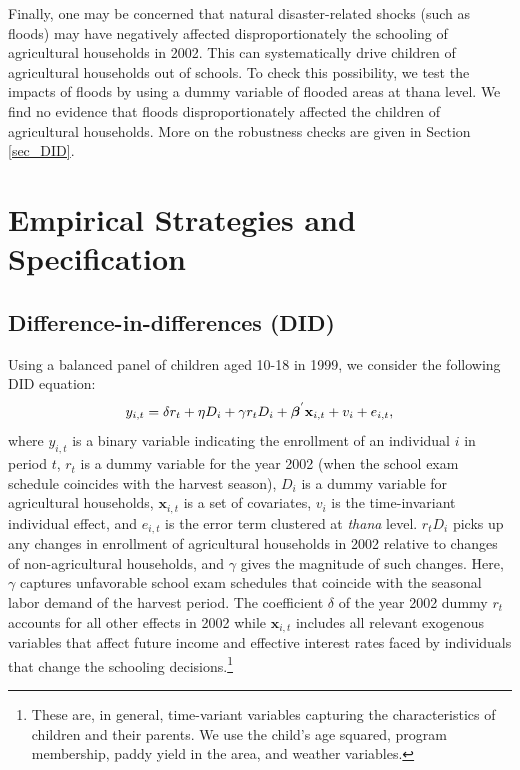 \documentclass[12pt,letterpaper]{article}
\newcommand{\SAdded}[1]{\textcolor{red}{#1}}
\newcommand{\bfbeta}{\ensuremath{\mbox{\boldmath $\beta$}}}
\newcommand{\0}{\ensuremath{\mbox{\boldmath $0$}}}
\begin{document}
Finally, one may be concerned that natural disaster-related shocks (such as floods) may have negatively affected disproportionately the schooling of agricultural households in 2002. This can systematically drive children of agricultural households out of schools. To check this possibility, we test the impacts of floods by using a dummy variable of flooded areas at thana level. We find no evidence that floods disproportionately affected the children of agricultural households. More on the robustness checks are given in Section \ref{sec_DID}. 


\section{Empirical Strategies and Specification}\label{sec_empirical}
\subsection{Difference-in-differences (DID)}

Using a balanced panel of children aged 10-18 in 1999, we consider the following DID equation:
\begin{equation}
y_{i,t} = \delta r_{t} + \eta D_{i} + \gamma r_{t}D_{i} + \bfbeta^{'} \textbf{x}_{i,t} + v_{i} + e_{i,t},
\label{estbase}
\end{equation}
where $y_{i,t}$ is a binary variable indicating the enrollment of an individual $i$ in period $t$, $r_{t}$ is a dummy variable for the year 2002 (when the school exam schedule coincides with the harvest season), $D_{i}$ is a dummy variable for agricultural households, $\textbf{x}_{i,t}$ is a set of covariates,  $v_{i}$ is the time-invariant individual effect, and $e_{i,t}$ is the error term clustered at \textit{thana} level. $r_{t}D_{i}$ picks up any changes in enrollment of agricultural households in 2002 relative to changes of non-agricultural households, and $\gamma$ gives the magnitude of such changes. %
Here, $\gamma$ captures unfavorable school exam schedules that coincide with the seasonal labor demand of the harvest period. The coefficient $\delta$ of the year 2002 dummy $r_{t}$ accounts for all other effects in 2002 while $\textbf{x}_{i,t}$ includes all relevant exogenous variables that affect future income and effective interest rates faced by individuals that change the schooling decisions.\footnote{These are, in general, time-variant variables capturing the characteristics of children and their parents. We use the child’s age squared, program membership, paddy yield in the area, and weather variables. }
\end{document}
